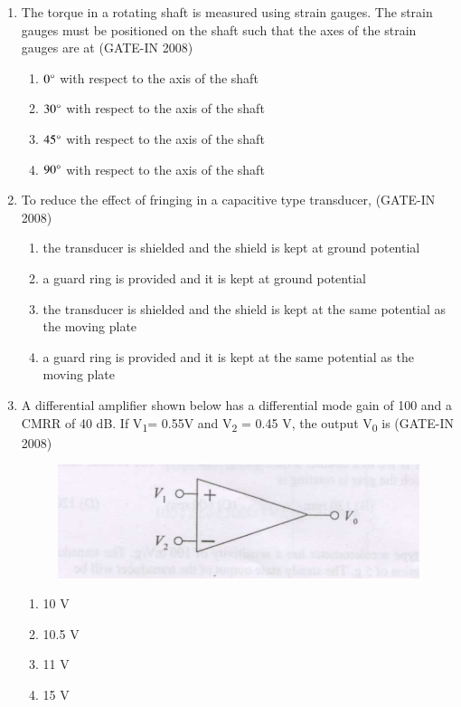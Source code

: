 \documentclass[journal,12pt,onecolumn]{IEEEtran}
\theoremstyle{remark}
\begin{document}
\begin{enumerate}
    \item The torque in a rotating shaft is measured using strain gauges. The strain gauges must be positioned
on the shaft such that the axes of the strain gauges are at (GATE-IN 2008)
\begin{multicols}{2}
    \begin{enumerate} 
        \item  $0\degree$ with respect to the axis of the shaft 
        \item  $30\degree$ with respect to the axis of the shaft
        \item  $45\degree$ with respect to the axis of the shaft
        \item  $90\degree$ with respect to the axis of the shaft
    \end{enumerate}
    \end{multicols}
    
    \item To reduce the effect of fringing in a capacitive type transducer, (GATE-IN 2008)
    \begin{enumerate} 
        \item  the transducer is shielded and the shield is kept at ground potential  
        \item  a guard ring is provided and it is kept at ground potential  
        \item   the transducer is shielded and the shield is kept at the same potential as the moving plate
        \item a guard ring is provided and it is kept at the same potential as the moving plate
    \end{enumerate}

    \item A differential amplifier shown below has a differential mode gain of 100 and a CMRR of 40 dB. If V\textsubscript{1}= 0.55V  and V\textsubscript{2} = 0.45 V, the output V\textsubscript{0} is (GATE-IN 2008)

 \begin{figure}[H]
    \centering
    \includegraphics[width=0.5\columnwidth]{figs/i18.jpg}
    \caption{}
    \label{fig:placeholder18}
\end{figure}

\begin{multicols}{4}     
    \begin{enumerate} 
        \item 10 V 
        \item 10.5 V
        \item 11 V
        \item 15 V
    \end{enumerate}
    \end{multicols}
    


\end{enumerate}
\end{document}
